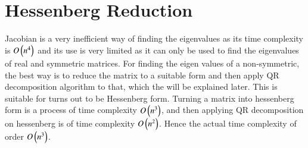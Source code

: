 \documentclass[a4paper,12pt]{article}
\theoremstyle{remark}
\begin{document}
\section{Hessenberg Reduction}
Jacobian is a very inefficient way of finding the eigenvalues as its time complexity is $O\left(n^4\right)$ and its use is very limited as it can only be used to find the eigenvalues of real and symmetric matrices. For finding the eigen values of a non-symmetric, the best way is to reduce the matrix to a suitable form and then apply QR decomposition algorithm to that, which the will be explained later. This is suitable for turns out to be Hessenberg form. Turning a matrix into hessenberg form is a process of time complexity $O\left(n^3\right)$, and then applying QR decomposition on hessenberg is of time complexity $O\left(n^2\right)$. Hence the actual time complexity of order $O\left(n^3\right)$.
\end{document}
